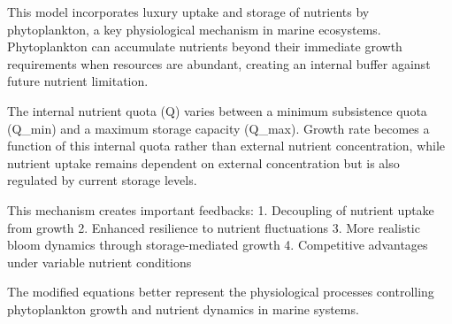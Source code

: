 This model incorporates luxury uptake and storage of nutrients by phytoplankton, a key physiological mechanism in marine ecosystems. Phytoplankton can accumulate nutrients beyond their immediate growth requirements when resources are abundant, creating an internal buffer against future nutrient limitation.

The internal nutrient quota (Q) varies between a minimum subsistence quota (Q_min) and a maximum storage capacity (Q_max). Growth rate becomes a function of this internal quota rather than external nutrient concentration, while nutrient uptake remains dependent on external concentration but is also regulated by current storage levels.

This mechanism creates important feedbacks:
1. Decoupling of nutrient uptake from growth
2. Enhanced resilience to nutrient fluctuations
3. More realistic bloom dynamics through storage-mediated growth
4. Competitive advantages under variable nutrient conditions

The modified equations better represent the physiological processes controlling phytoplankton growth and nutrient dynamics in marine systems.
